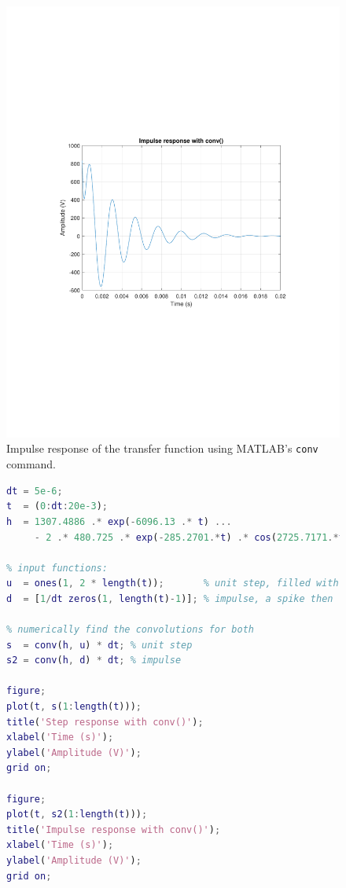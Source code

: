 \documentclass{homework}
\begin{document}
	\begin{figure}[H]
		\centering
		\includegraphics[width=0.7\linewidth,clip,trim=4cm 8.5cm 3cm 8.5cm]{part4_impulse}
		\caption{Impulse response of the transfer function using MATLAB's \texttt{conv} command.}
		\label{fig:part4impulse}
	\end{figure}

	\begin{figure}[H]
	\begin{lstlisting}[language=matlab, caption={MATLAB code for the convolutions.},label={lst:conv}]
% reusing the transfer function from Part II.
dt = 5e-6;
t  = (0:dt:20e-3);
h  = 1307.4886 .* exp(-6096.13 .* t) ...
     - 2 .* 480.725 .* exp(-285.2701.*t) .* cos(2725.7171.*t + deg2rad(60.45));

% input functions:
u  = ones(1, 2 * length(t));       % unit step, filled with 1
d  = [1/dt zeros(1, length(t)-1)]; % impulse, a spike then filled with 0

% numerically find the convolutions for both
s  = conv(h, u) * dt; % unit step
s2 = conv(h, d) * dt; % impulse

figure;
plot(t, s(1:length(t)));
title('Step response with conv()');
xlabel('Time (s)');
ylabel('Amplitude (V)');
grid on;

figure;
plot(t, s2(1:length(t)));
title('Impulse response with conv()');
xlabel('Time (s)');
ylabel('Amplitude (V)');
grid on;
	\end{lstlisting}
\end{figure}
\end{document}
